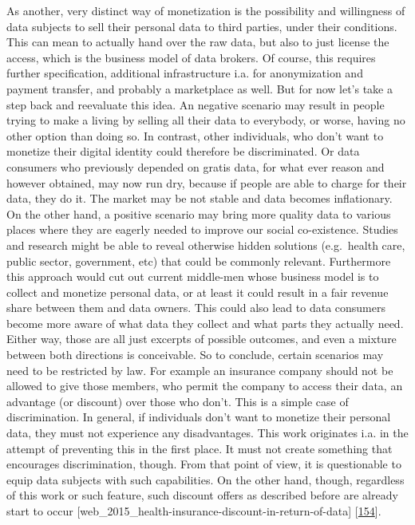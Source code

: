 \documentclass[12pt,english,a4paper,titlepage,cleardoublepage=empty,dottedtoc]{report}
\begin{document}
As another, very distinct way of monetization is the possibility and
willingness of data subjects to sell their personal data to third
parties, under their conditions. This can mean to actually hand over the
raw data, but also to just license the access, which is the business
model of data brokers. Of course, this requires further specification,
additional infrastructure i.a. for anonymization and payment transfer,
and probably a marketplace as well. But for now let's take a step back
and reevaluate this idea. An negative scenario may result in people
trying to make a living by selling all their data to everybody, or
worse, having no other option than doing so. In contrast, other
individuals, who don't want to monetize their digital identity could
therefore be discriminated. Or data consumers who previously depended on
gratis data, for what ever reason and however obtained, may now run dry,
because if people are able to charge for their data, they do it. The
market may be not stable and data becomes inflationary. On the other
hand, a positive scenario may bring more quality data to various places
where they are eagerly needed to improve our social co-existence.
Studies and research might be able to reveal otherwise hidden solutions
(e.g.~health care, public sector, government, etc) that could be
commonly relevant. Furthermore this approach would cut out current
middle-men whose business model is to collect and monetize personal
data, or at least it could result in a fair revenue share between them
and data owners. This could also lead to data consumers become more
aware of what data they collect and what parts they actually need.
Either way, those are all just excerpts of possible outcomes, and even a
mixture between both directions is conceivable. So to conclude, certain
scenarios may need to be restricted by law. For example an insurance
company should not be allowed to give those members, who permit the
company to access their data, an advantage (or discount) over those who
don't. This is a simple case of discrimination. In general, if
individuals don't want to monetize their personal data, they must not
experience any disadvantages. This work originates i.a. in the attempt
of preventing this in the first place. It must not create something that
encourages discrimination, though. From that point of view, it is
questionable to equip data subjects with such capabilities. On the other
hand, though, regardless of this work or such feature, such discount
offers as described before are already start to occur
{[}web\_2015\_health-insurance-discount-in-return-of-data{]}
{[}\protect\hyperlink{ref-web_2016_insurance-discount-in-return-of-data}{154}{]}.
\end{document}
